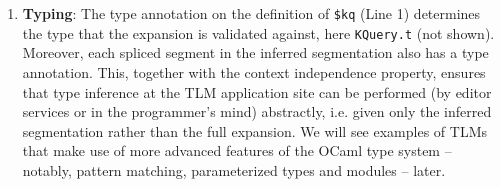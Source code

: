 \documentclass[acmsmall,review,anonymous]{acmart}\settopmatter{printfolios=true,printccs=false,printacmref=false}
\newcommand{\li}[1]{\lstinline[basicstyle=\ttfamily\fontsize{9pt}{1em}\selectfont]{#1}}
\begin{document}
\begin{enumerate}[leftmargin=12pt]
\item[\CIRCLE] \textbf{Typing}: The type annotation on the definition of \li{$kq} (Line 1) determines the type that the expansion is validated against, here \li{KQuery.t} (not shown). Moreover, each spliced segment in the inferred segmentation also has  a type annotation. This, together with the context independence property, ensures that type inference at the TLM application site can be performed (by editor services or in the programmer's mind) abstractly, i.e. given only the inferred segmentation rather than the full expansion. We will see examples of TLMs that make use of more advanced features of the OCaml type system -- notably, pattern matching, parameterized types and modules -- later. %
\end{enumerate}

\end{document}
